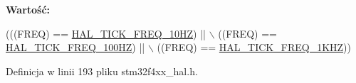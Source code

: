 {\bfseries Wartość\+:}
\begin{DoxyCode}
(((FREQ) == \hyperlink{group___h_a_l___t_i_c_k___f_r_e_q_ggab36ec81674817249c46734772ff3b73aabf4d022d85adb437a57c1f45d6345092}{HAL\_TICK\_FREQ\_10HZ})  || \(\backslash\)
                           ((FREQ) == \hyperlink{group___h_a_l___t_i_c_k___f_r_e_q_ggab36ec81674817249c46734772ff3b73aacb1ef3a0e9632aafe0fd162e2cd88408}{HAL\_TICK\_FREQ\_100HZ}) || \(\backslash\)
                           ((FREQ) == \hyperlink{group___h_a_l___t_i_c_k___f_r_e_q_ggab36ec81674817249c46734772ff3b73aabef41c8ee13ca1d48eb49dac912f9689}{HAL\_TICK\_FREQ\_1KHZ}))
\end{DoxyCode}


Definicja w linii 193 pliku stm32f4xx\+\_\+hal.\+h.

